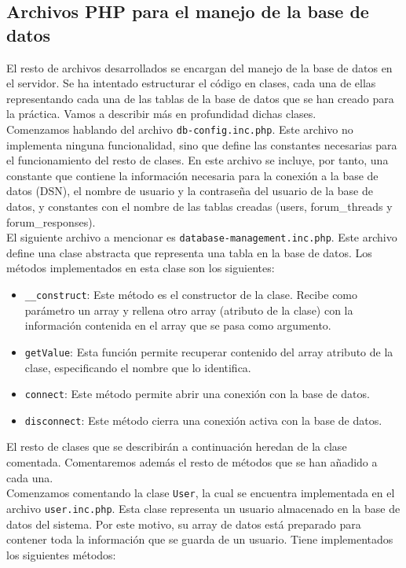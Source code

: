 \documentclass[11pt]{article}
\theoremstyle{plain}
\theoremstyle{definition}
\begin{document}
\subsection{Archivos PHP para el manejo de la base de datos}

El resto de archivos desarrollados se encargan del manejo de la base
de datos en el servidor. Se ha intentado estructurar el código en
clases, cada una de ellas representando cada una de las tablas de la
base de datos que se han creado para la práctica. Vamos
a describir más en profundidad dichas clases.\\

Comenzamos hablando del archivo \texttt{db-config.inc.php}. Este
archivo no implementa ninguna funcionalidad, sino que define las
constantes necesarias para el funcionamiento del resto de clases.  En
este archivo se incluye, por tanto, una constante que contiene la
información necesaria para la conexión a la base de datos (DSN), el
nombre de usuario y la contraseña del usuario de la base de datos, y
constantes con el nombre de las tablas creadas
(users, forum\_threads y forum\_responses).\\

El siguiente archivo a mencionar es
\texttt{database-management.inc.php}.  Este archivo define una clase
abstracta que representa una tabla en la base de datos. Los métodos
implementados en esta clase son los siguientes:

\begin{itemize}
\item \texttt{\_\_construct}: Este método es el constructor de la clase.
  Recibe como parámetro un array y rellena otro array (atributo de la
  clase) con la información contenida en el array que se pasa como
  argumento.
\item \texttt{getValue}: Esta función permite recuperar contenido del
  array atributo de la clase, especificando el nombre que lo identifica.
\item \texttt{connect}: Este método permite abrir una conexión con la
  base de datos.
\item \texttt{disconnect}: Este método cierra una conexión activa con
  la base de datos.
\end{itemize}

El resto de clases que se describirán a continuación heredan de la
clase comentada. Comentaremos además el resto de métodos que se
han añadido a cada una.\\

Comenzamos comentando la clase \texttt{User}, la cual se encuentra
implementada en el archivo \texttt{user.inc.php}. Esta clase representa
un usuario almacenado en la base de datos del sistema. Por este motivo,
su array de datos está preparado para contener toda la información
que se guarda de un usuario. Tiene implementados los siguientes métodos:
\end{document}

